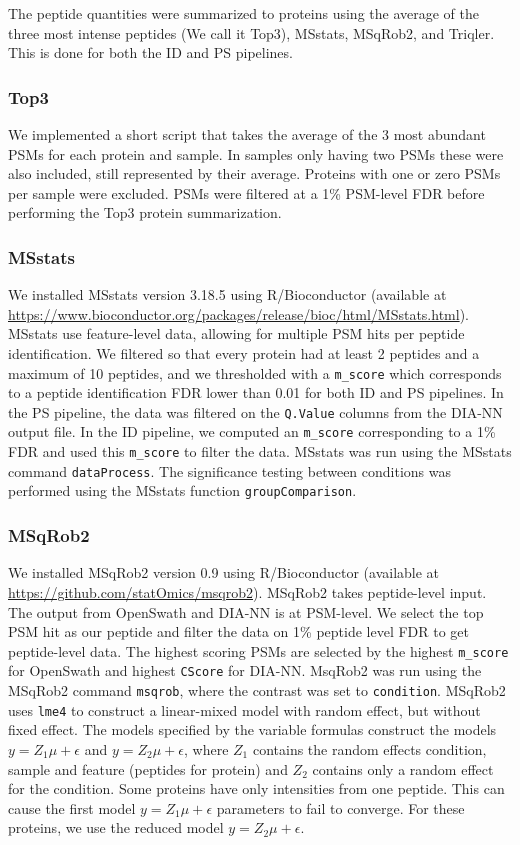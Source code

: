 \documentclass[10pt,letterpaper]{article}
\begin{document}
The peptide quantities were summarized to proteins using the average of the three most intense peptides (We call it Top3), MSstats, MSqRob2, and Triqler. This is done for both the ID and PS pipelines. 

\subsubsection*{Top3}

We implemented a short script that takes the average of the 3 most abundant PSMs for each protein and sample. In samples only having two PSMs these were also included, still represented by their average. Proteins with one or zero PSMs per sample were excluded. PSMs were filtered at a 1\% PSM-level FDR before performing the Top3 protein summarization. 

\subsubsection*{MSstats}

We installed MSstats version 3.18.5 using R/Bioconductor (available at \url{https://www.bioconductor.org/packages/release/bioc/html/MSstats.html}). MSstats use feature-level data, allowing for multiple PSM hits per peptide identification. We filtered so that every protein had at least 2 peptides and a maximum of 10 peptides, and we thresholded with a \texttt{m\_score} which corresponds to a peptide identification FDR lower than 0.01 for both ID and PS pipelines. In the PS pipeline, the data was filtered on the \texttt{Q.Value} columns from the DIA-NN output file. In the ID pipeline, we computed an \texttt{m\_score} corresponding to a 1\% FDR and used this \texttt{m\_score} to filter the data. MSstats was run using the MSstats command \texttt{dataProcess}. The significance testing between conditions was performed using the MSstats function \texttt{groupComparison}.  

\subsubsection*{MSqRob2}
%
We installed MSqRob2 version 0.9 using R/Bioconductor (available at \url{https://github.com/statOmics/msqrob2}). MSqRob2 takes peptide-level input. The output from OpenSwath and DIA-NN is at PSM-level. We select the top PSM hit as our peptide and filter the data on 1\% peptide level FDR to get peptide-level data. The highest scoring PSMs are selected by the highest \texttt{m\_score} for OpenSwath and highest \texttt{CScore} for DIA-NN. MsqRob2 was run using the MSqRob2 command \texttt{msqrob}, where the contrast was set to \texttt{condition}.
MSqRob2 uses \texttt{lme4} to construct a linear-mixed model with random effect, but without fixed effect. The models specified by the variable formulas construct the models $y = Z_1 \mu + \epsilon$ and $y = Z_2 \mu + \epsilon$, where $Z_1$ contains the random effects condition, sample and feature (peptides for protein) and $Z_2$ contains only a random effect for the condition. Some proteins have only intensities from one peptide. This can cause the first model $y = Z_1 \mu + \epsilon$ parameters to fail to converge. For these proteins, we use the reduced model $y = Z_2 \mu + \epsilon$.
\end{document}
